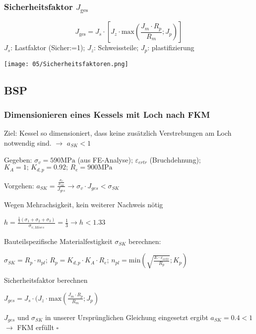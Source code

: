         \subsubsection{Sicherheitsfaktor $J_{\textrm{ges}}$}
        \small\[J_{\textrm{ges}}= J_s \cdot \left[ J_z \cdot \textrm{max}\left(\frac{J_m \cdot R_p}{R_m}; J_p \right) \right] \]\normalsize
        $J_s$: Lastfaktor (Sicher:=1); $J_z$: Schweissteile; $J_p$: plastifizierung
        \begin{center}
            \texttt{[image: 05/Sicherheitsfaktoren.png]}
        \end{center}
    
    \subsection{BSP}
        \subsubsection{Dimensionieren eines Kessels mit Loch nach FKM}
        Ziel: Kessel so dimensioniert, dass keine zusätzlich Verstrebungen am Loch notwendig sind. $\rightarrow$  $ a_{SK}<1 $
        
        Gegeben: $ \sigma_v = 590 \textrm{MPa} $ (aus FE-Analyse); $ \varepsilon_{ertr} $ (Bruchdehnung); $K_A = 1 \textrm{; } K_{d,p} = 0.92 \textrm{; } R_e = 900 \textrm{MPa} $
        
        Vorgehen:
        $ a_{{SK}} = \frac{\frac{\sigma_v}{\sigma_{{SK}}}}{J_{ges}}  \rightarrow  \sigma_v \cdot J_{ges} < \sigma_{{SK}} $
        
        Wegen Mehrachsigkeit, kein weiterer Nachweis nötig
        
        $ h = \frac{\frac{1}{3}(\sigma_1+\sigma_2+\sigma_3)}{\sigma_{{v,Mises}}}=\frac{1}{3} 
        \rightarrow  h_{} < 1.33_{} $
        
        Bauteilspezifische Materialfestigkeit $ \sigma_{SK} $ berechnen:
        
        $ \sigma_{SK} = R_p \cdot n_{pl} $;
        $ R_p = K_{d,p} \cdot K_A \cdot R_e $; %
        $ n_{pl} = \textrm{min}(\sqrt{\frac{E \cdot \varepsilon_{ertr}}{R_p}}; K_p) $
        
        Sicherheitsfaktor berechnen
        
        $ J_{ges} = J_s \cdot ( J_z \cdot \textrm{max}(\frac{J_m \cdot R_p}{R_m} ; J_p) $
        
        $ {J_{ges}} \textrm{ und } \sigma_{SK}$ in unserer Ursprünglichen Gleichung eingesetzt ergibt ${a_{SK} = 0.4 < 1} $ $\rightarrow$ FKM erfüllt $\square$ 
